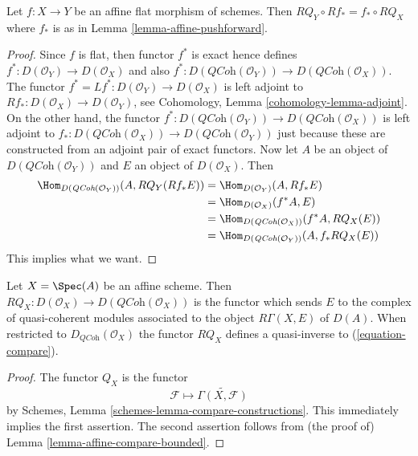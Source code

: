 \begin{lemma}
\label{lemma-affine-flat-coherator}
Let $f : X \to Y$ be an affine flat morphism of schemes.
Then $RQ_Y \circ Rf_* = f_* \circ RQ_X$ where $f_*$ is as
in Lemma \ref{lemma-affine-pushforward}.
\end{lemma}

\begin{proof}
Since $f$ is flat, then functor $f^*$ is exact hence defines
$f^* : D(\mathcal{O}_Y) \to D(\mathcal{O}_X)$ and also
$f^* : D(\textit{QCoh}(\mathcal{O}_Y)) \to D(\textit{QCoh}(\mathcal{O}_X))$.
The functor $f^* = Lf^* : D(\mathcal{O}_Y) \to D(\mathcal{O}_X)$
is left adjoint to
$Rf_* : D(\mathcal{O}_X) \to D(\mathcal{O}_Y)$,
see Cohomology, Lemma \ref{cohomology-lemma-adjoint}.
On the other hand, the functor
$f^* : D(\textit{QCoh}(\mathcal{O}_Y)) \to D(\textit{QCoh}(\mathcal{O}_X))$
is left adjoint to
$f_* : D(\textit{QCoh}(\mathcal{O}_X)) \to D(\textit{QCoh}(\mathcal{O}_Y))$
just because these are constructed from an adjoint pair of exact functors.
Now let $A$ be an object of $D(\textit{QCoh}(\mathcal{O}_Y))$ and
$E$ an object of $D(\mathcal{O}_X)$. Then
\begin{align*}
\Hom_{D(\textit{QCoh}(\mathcal{O}_Y))}(A, RQ_Y(Rf_*E))
& =
\Hom_{D(\mathcal{O}_Y)}(A, Rf_*E) \\
& =
\Hom_{D(\mathcal{O}_X)}(f^*A, E) \\
& =
\Hom_{D(\textit{QCoh}(\mathcal{O}_X))}(f^*A, RQ_X(E)) \\
& =
\Hom_{D(\textit{QCoh}(\mathcal{O}_Y))}(A, f_*RQ_X(E))
\end{align*}
This implies what we want.
\end{proof}

\begin{lemma}
\label{lemma-affine-coherator}
Let $X = \Spec(A)$ be an affine scheme. Then
$RQ_X : D(\mathcal{O}_X) \to D(\textit{QCoh}(\mathcal{O}_X))$
is the functor which sends $E$ to the complex of quasi-coherent modules
associated to the object $R\Gamma(X, E)$ of $D(A)$. When
restricted to $D_{\textit{QCoh}}(\mathcal{O}_X)$ the functor
$RQ_X$ defines a quasi-inverse to (\ref{equation-compare}).
\end{lemma}

\begin{proof}
The functor $Q_X$ is the functor
$$
\mathcal{F} \mapsto \widetilde{\Gamma(X, \mathcal{F})}
$$
by Schemes, Lemma \ref{schemes-lemma-compare-constructions}.
This immediately implies the first assertion. The second assertion
follows from (the proof of)
Lemma \ref{lemma-affine-compare-bounded}.
\end{proof}

